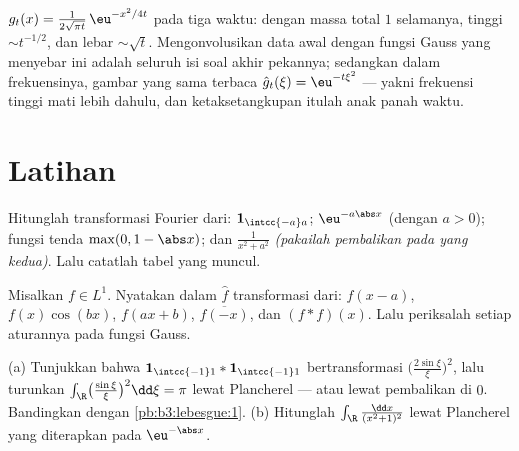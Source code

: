 \begin{omfigure}

{\small {} $g_t(x) =
\frac1{2\sqrt{\pi t}}\,\eu^{-x^2/4t}$ pada tiga waktu: dengan massa
total $1$ selamanya, tinggi $\sim t^{-1/2}$, dan lebar $\sim
\sqrt t$. Mengonvolusikan data awal dengan fungsi Gauss yang
menyebar ini adalah seluruh isi soal akhir pekannya; sedangkan dalam
frekuensinya, gambar yang sama terbaca
$\hat g_t(\xi) = \eu^{-t\xi^2}$ --- yakni frekuensi tinggi mati
lebih dahulu, dan ketaksetangkupan itulah anak panah waktu.}
\end{omfigure}

\section{Latihan}

\begin{exercise}[$\star$]\label{exo:b3:fouriertransform:1}
Hitunglah transformasi Fourier dari: $\mathbf 1_{\intcc{-a}a}$;
$\eu^{-a\abs x}$ (dengan $a > 0$); fungsi tenda $\max(0, 1 -
\abs x)$; dan $\frac1{x^2 + a^2}$ \emph{(pakailah pembalikan pada
yang kedua)}. Lalu catatlah tabel yang muncul.
\end{exercise}

\begin{exercise}[$\star$]\label{exo:b3:fouriertransform:2}
Misalkan $f \in L^1$. Nyatakan dalam $\hat f$ transformasi
dari: $f(x - a)$, $f(x)\cos(bx)$, $f(ax + b)$,
$\overline{f(-x)}$, dan $(f * f)(x)$. Lalu periksalah setiap aturannya pada
fungsi Gauss.
\end{exercise}

\begin{exercise}[$\star\star$]\label{exo:b3:fouriertransform:3}
(a) Tunjukkan bahwa $\mathbf 1_{\intcc{-1}1} * \mathbf
1_{\intcc{-1}1}$ bertransformasi $\bigl(\frac{2\sin\xi}\xi
\bigr)^2$, lalu turunkan
$\int_\R\bigl(\frac{\sin\xi}\xi\bigr)^2\dd\xi = \pi$ lewat
Plancherel --- atau lewat pembalikan di $0$. Bandingkan dengan
\cref{pb:b3:lebesgue:1}.
(b) Hitunglah $\int_\R\frac{\dd x}{(x^2+1)^2}$ lewat Plancherel
yang diterapkan pada $\eu^{-\abs x}$.
\end{exercise}


